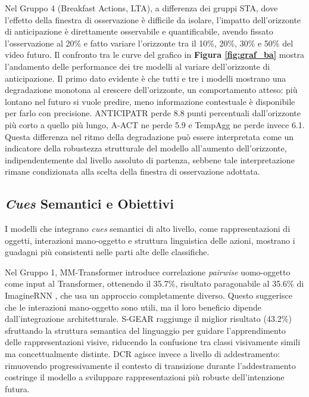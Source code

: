 Nel Gruppo 4 (Breakfast Actions, LTA), a differenza dei gruppi STA, dove l'effetto della finestra di osservazione è difficile da isolare, l'impatto dell'orizzonte di anticipazione è direttamente osservabile e quantificabile, avendo fissato l'osservazione al 20\% e fatto variare l'orizzonte tra il 10\%, 20\%, 30\% e 50\% del video futuro. Il confronto tra le curve del grafico in \textbf{Figura \ref{fig:graf_ba}}  mostra l'andamento delle performance dei tre modelli al variare dell'orizzonte di anticipazione. Il primo dato evidente è che tutti e tre i modelli mostrano una degradazione monotona al crescere dell'orizzonte, un comportamento atteso: più lontano nel futuro si vuole predire, meno informazione contestuale è disponibile per farlo con precisione. ANTICIPATR \cite{nawhal2022rethinking} perde 8.8 punti percentuali dall'orizzonte più corto a quello più lungo, A-ACT \cite{gupta2022act} ne perde 5.9 e TempAgg \cite{sener2021technical, sener2020temporal} ne perde invece 6.1. Questa differenza nel ritmo della degradazione può essere interpretata come un indicatore della robustezza strutturale del modello all'aumento dell'orizzonte, indipendentemente dal livello assoluto di partenza, sebbene tale interpretazione rimane condizionata alla scelta della finestra di osservazione adottata.
\subsection{\textit{Cues} Semantici e Obiettivi}
I modelli che integrano \textit{cues} semantici di alto livello, come rappresentazioni di oggetti, interazioni mano-oggetto e struttura linguistica delle azioni, mostrano i guadagni più consistenti nelle parti alte delle classifiche.

Nel Gruppo 1, MM-Transformer \cite{roy2021action} introduce correlazione \textit{pairwise} uomo-oggetto come input al Transformer, ottenendo il 35.7\%, risultato paragonabile al 35.6\% di ImagineRNN \cite{wu2020learning}, che usa un approccio completamente diverso. Questo suggerisce che le interazioni mano-oggetto sono utili, ma il loro beneficio dipende dall'integrazione architetturale. S-GEAR \cite{diko2024semantically} raggiunge il miglior risultato (43.2\%) sfruttando la struttura semantica del linguaggio per guidare l'apprendimento delle rappresentazioni visive, riducendo la confusione tra classi visivamente simili ma concettualmente distinte. DCR \cite{xu2022learning} agisce invece a livello di addestramento: rimuovendo progressivamente il contesto di transizione durante l'addestramento costringe il modello a sviluppare rappresentazioni più robuste dell'intenzione futura.

